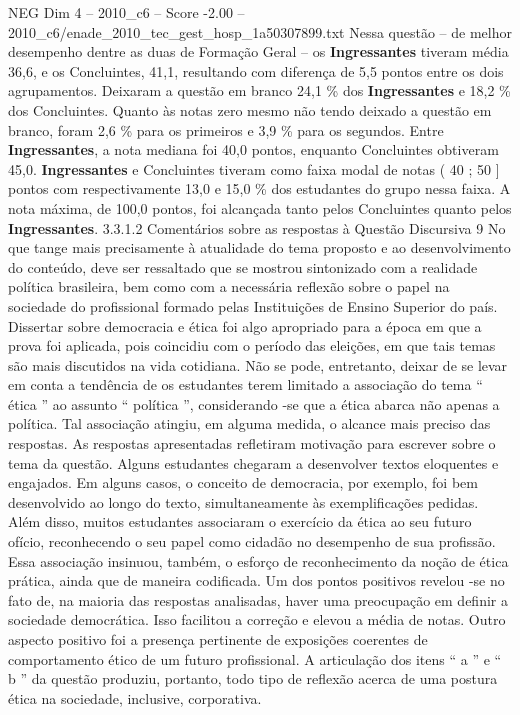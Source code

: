 \begin{textsample}{NEG Dim 4 – 2010\_c6 – Score -2.00 – 2010\_c6/enade\_2010\_tec\_gest\_hosp\_1a50307899.txt}
Nessa questão – de melhor desempenho dentre as duas de Formação Geral – os \textbf{Ingressantes} tiveram média 36,6, e os Concluintes, 41,1, resultando com diferença de 5,5 pontos entre os dois agrupamentos.
Deixaram a questão em branco 24,1 \% dos \textbf{Ingressantes} e 18,2 \% dos Concluintes.
Quanto às notas zero mesmo não tendo deixado a questão em branco, foram 2,6 \% para os primeiros e 3,9 \% para os segundos.
Entre \textbf{Ingressantes}, a nota mediana foi 40,0 pontos, enquanto Concluintes obtiveram 45,0. \textbf{Ingressantes} e Concluintes tiveram como faixa modal de notas ( 40 ; 50 ] pontos com respectivamente 13,0 e 15,0 \% dos estudantes do grupo nessa faixa.
A nota máxima, de 100,0 pontos, foi alcançada tanto pelos Concluintes quanto pelos \textbf{Ingressantes}. 3.3.1.2 Comentários sobre as respostas à Questão Discursiva 9 No que tange mais precisamente à atualidade do tema proposto e ao desenvolvimento do conteúdo, deve ser ressaltado que se mostrou sintonizado com a realidade política brasileira, bem como com a necessária reflexão sobre o papel na sociedade do profissional formado pelas Instituições de Ensino Superior do país.
Dissertar sobre democracia e ética foi algo apropriado para a época em que a prova foi aplicada, pois coincidiu com o período das eleições, em que tais temas são mais discutidos na vida cotidiana.
Não se pode, entretanto, deixar de se levar em conta a tendência de os estudantes terem limitado a associação do tema “ ética ” ao assunto “ política ”, considerando -se que a ética abarca não apenas a política.
Tal associação atingiu, em alguma medida, o alcance mais preciso das respostas.
As respostas apresentadas refletiram motivação para escrever sobre o tema da questão.
Alguns estudantes chegaram a desenvolver textos eloquentes e engajados.
Em alguns casos, o conceito de democracia, por exemplo, foi bem desenvolvido ao longo do texto, simultaneamente às exemplificações pedidas.
Além disso, muitos estudantes associaram o exercício da ética ao seu futuro ofício, reconhecendo o seu papel como cidadão no desempenho de sua profissão.
Essa associação insinuou, também, o esforço de reconhecimento da noção de ética prática, ainda que de maneira codificada.
Um dos pontos positivos revelou -se no fato de, na maioria das respostas analisadas, haver uma preocupação em definir a sociedade democrática.
Isso facilitou a correção e elevou a média de notas.
Outro aspecto positivo foi a presença pertinente de exposições coerentes de comportamento ético de um futuro profissional.
A articulação dos itens “ a ” e “ b ” da questão produziu, portanto, todo tipo de reflexão acerca de uma postura ética na sociedade, inclusive, corporativa.

\end{textsample}
